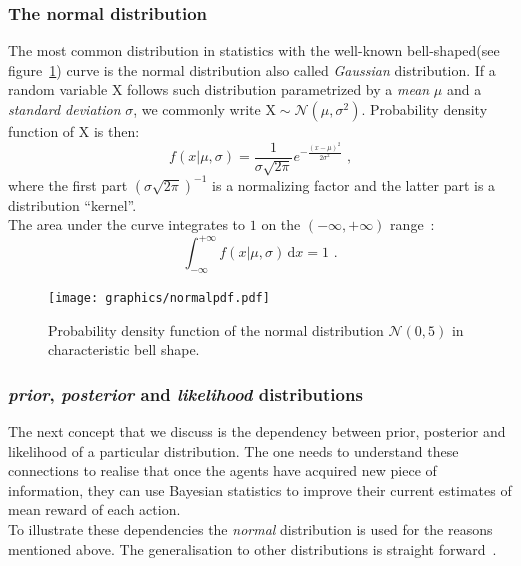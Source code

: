 \documentclass[12pt, a4paper, pdflatex, leqno, twoside]{report}
\begin{document}
\subsubsection{The normal distribution}
The most common distribution in statistics with the well-known bell-shaped(see 
figure~\ref{fig:normaldist}) curve is the normal distribution also called 
\emph{Gaussian} distribution. If a random variable $\mathrm{X}$ follows such 
distribution parametrized by a \emph{mean} $\mu$ and a \emph{standard deviation} 
$\sigma$, we commonly write $\mathrm{X} \sim \mathcal{N}\left( \mu, \sigma^2 
\right)$. Probability density function of $\mathrm{X}$ is then:
$$
f \left(x | \mu, \sigma \right) = \frac{1}{\sigma \sqrt{2 \pi }} e^{- \frac{ 
{\left (  x - \mu \right )}^2 }{2 \sigma^2} } \text{ ,}
$$
where the first part ${\left( \sigma \sqrt{2 \pi } \right)}^{-1}$ is a 
normalizing factor and the latter part is a distribution ``kernel''.\\
The area under the curve integrates to $1$ on the $(-\infty, +\infty)$ range~\citep{rice1995mathematical}:
$$
\int_{-\infty}^{+\infty} \! f \left(x | \mu, \sigma \right) \, \mathrm{d}x = 1 
\text{ .}
$$


\begin{figure}[htbp]
\centering
\texttt{[image: graphics/normalpdf.pdf]}
\begin{tiny}
\caption{Probability density function of the normal distribution $\mathcal{N}\left( 
0, 5 \right)$ in characteristic bell shape.\label{fig:normaldist}}
\end{tiny}
\vspace{1cm}
\end{figure}



\subsubsection{\emph{prior}, \emph{posterior} and \emph{likelihood} 
distributions}                               
The next concept that we discuss is the dependency between prior, posterior 
and likelihood of a particular distribution. The one needs to understand these connections to realise that once the agents have acquired new piece of information, they can use Bayesian statistics to improve their current estimates of mean reward of each action.\\
To illustrate these dependencies the \emph{normal} 
distribution is used for the reasons mentioned above. The generalisation 
to other distributions is straight forward~\citep{gelman2003bayesian}.\\
\end{document}
